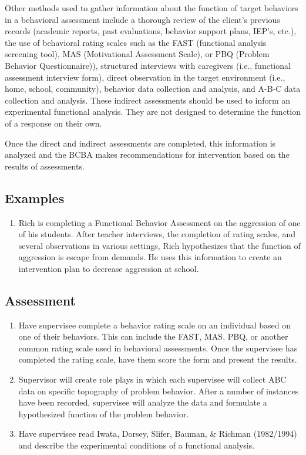 Other methods used to gather information about the function of target behaviors in a behavioral assessment include a thorough review of the client's previous records (academic reports, past evaluations, behavior support plans, IEP's, etc.), the use of behavioral rating scales such as the FAST (functional analysis screening tool), MAS (Motivational Assessment Scale), or PBQ (Problem Behavior Questionnaire)), structured interviews with caregivers (i.e., functional assessment interview form), direct observation in the target environment (i.e., home, school, community), behavior data collection and analysis, and A-B-C data collection and analysis. These indirect assessments should be used to inform an experimental functional analysis. They are not designed to determine the function of a response on their own.

Once the direct and indirect assessments are completed, this information is analyzed and the BCBA makes recommendations for intervention based on the results of assessments. 
%
\subsection{Examples}
\begin{enumerate}
\item Rich is completing a Functional Behavior Assessment on the aggression of one of his students. After teacher interviews, the completion of rating scales, and several observations in various settings, Rich hypothesizes that the function of aggression is escape from demands. He uses this information to create an intervention plan to decrease aggression at school. 
%
\end{enumerate}
%
\subsection{Assessment}
\begin{enumerate}
\item Have supervisee complete a behavior rating scale on an individual based on one of their behaviors. This can include the FAST, MAS, PBQ, or another common rating scale used in behavioral assessments. Once the supervisee has completed the rating scale, have them score the form and present the results. 
\item Supervisor will create role plays in which each supervisee will collect ABC data on specific topography of problem behavior. After a number of instances have been recorded, supervisee will analyze the data and formulate a hypothesized function of the problem behavior.
\item Have supervisee read Iwata, Dorsey, Slifer, Bauman, \& Richman (1982/1994) and describe the experimental conditions of a functional analysis.
%
\end{enumerate}
%
